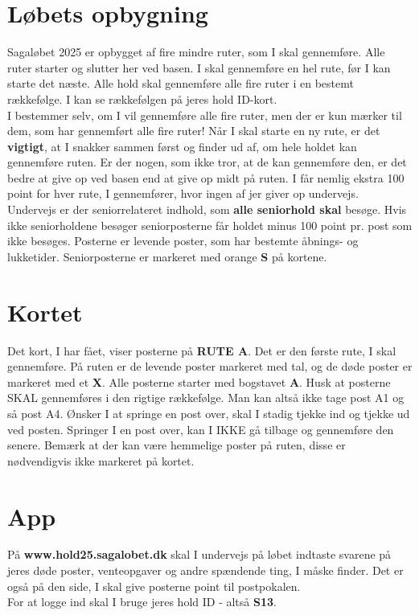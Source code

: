 \section{Løbets opbygning}
Sagaløbet 2025 er opbygget af fire mindre ruter, som I skal gennemføre. Alle ruter starter og slutter her ved basen. I skal gennemføre en hel rute, før I kan starte det næste. Alle hold skal gennemføre alle fire ruter i en bestemt rækkefølge. I kan se rækkefølgen på jeres hold ID-kort.\\\newline
I bestemmer selv, om I vil gennemføre alle fire ruter, men der er kun mærker til dem, som har gennemført alle fire ruter! Når I skal starte en ny rute, er det \textbf{vigtigt}, at I snakker sammen først og finder ud af, om hele holdet kan gennemføre ruten. Er der nogen, som ikke tror, at de kan gennemføre den, er det bedre at give op ved basen end at give op midt på ruten. I får nemlig ekstra 100 point for hver rute, I gennemfører, hvor ingen af jer giver op undervejs.\\
\newline
Undervejs er der seniorrelateret indhold, som \textbf{alle seniorhold skal} besøge. Hvis ikke seniorholdene besøger seniorposterne får holdet minus 100 point pr. post som ikke besøges. Posterne er levende poster, som har bestemte åbnings- og lukketider. Seniorposterne er markeret med orange \textbf{S} på kortene.\\
\newline
\section{Kortet}
Det kort, I har fået, viser posterne på \textbf{RUTE A}. Det er den første rute, I skal gennemføre. På ruten er de levende poster markeret med tal, og de døde poster er markeret med et \textbf{X}. Alle posterne starter med bogstavet \textbf{A}. Husk at posterne SKAL gennemføres i den rigtige rækkefølge. Man kan altså ikke tage post A1 og så post A4. Ønsker I at springe en post over, skal I stadig tjekke ind og tjekke ud ved posten. Springer I en post over, kan I IKKE gå tilbage og gennemføre den senere. Bemærk at der kan være hemmelige poster på ruten, disse er nødvendigvis ikke markeret på kortet.
\section{App}
På \textbf{www.hold25.sagalobet.dk} skal I undervejs på løbet indtaste svarene på jeres døde poster, venteopgaver og andre spændende ting, I måske finder. Det er også på den side, I skal give posterne point til postpokalen.\\
For at logge ind skal I bruge jeres hold ID - altså \textbf{S13}.
\newpage
